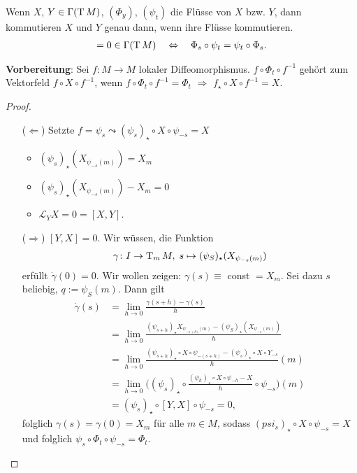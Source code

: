 \begin{proposition}
	Wenn $X$, $Y\in\Gamma(\operatorname{T} M)$, $(\Phi_y)$, $(\psi_t)$ die Flüsse von $X$ bzw. $Y$, dann kommutieren $X$ und $Y$ genau dann, wenn ihre Flüsse kommutieren.\begin{align*}
		[X,Y] = 0\in\Gamma(\T M)\quad\Leftrightarrow \quad\Phi_s\circ\psi_t = \psi_t\circ\Phi_s.
	\end{align*}
\end{proposition}

\textbf{Vorbereitung}: Sei $f\colon M\to M$ lokaler Diffeomorphismus. $f\circ \Phi_t\circ f^{-1}$ gehört zum Vektorfeld $f\circ X\circ f^{-1}$, wenn $f\circ\Phi_t\circ f^{-1}=\Phi_t$ $\Rightarrow$ $f_\star\circ X\circ f^{-1} = X$.

\begin{proof}
	\leavevmode\begin{itemize}[wide=0pt,leftmargin=*,widest={($\Rightarrow$)},topsep=-6pt]
		\item[($\Leftarrow$)] Setzte $f=\psi_s\leadsto (\psi_s)_\star\circ X\circ \psi_{-s} = X$\begin{itemize}[topsep=-0.25\baselineskip,label={$\Rightarrow$}]
			\item $(\psi_s)_\star(X_{\psi_{-s}(m)}) = X_m$
			\item $(\psi_s)_\star(X_{\psi_{-s}(m)}) - X_m = 0$
			\item $\mathcal L_Y X = 0 = [X,Y]$.
		\end{itemize}
		\item[($\Rightarrow$)] $[Y,X] = 0$. Wir wüssen, die Funktion \begin{align*}
			\gamma\colon I\to \operatorname{T}_m M,\; s\mapsto (\psi_S)_\star(X_{\psi_{-s}(m)})
		\end{align*}
		erfüllt $\dot\gamma(0) = 0$. Wir wollen zeigen: $\gamma(s)\equiv$ const $=X_m$. Sei dazu $s$ beliebig, $q := \psi_S(m)$. Dann gilt \begin{align*}
			\dot\gamma(s) &= \lim\limits_{h\to 0} \frac{\gamma(s+h)-\gamma(s)}{h} \\
			&= \lim\limits_{h\to 0} \frac{(\psi_{s+h})_\star X_{\psi_{-s+h)}(m)} - (\psi_S)_\star(X_{\psi_{-s}(m)})}h \\
			&=\lim\limits_{h\to 0} \frac{(\psi_{s+h})_\star\circ X\circ \psi_{-(s+h)}-(\psi_s)_\star \circ X\circ Y_{-s}}{h}(m)\\
			&= \lim\limits_{h\to 0} \big( (\psi_s)_\star\circ \frac{(\psi_h)_\star\circ X\circ \psi_{-h}-X}{h}\circ \psi_{-s}\big)(m)\\
			&= (\psi_s)_\star\circ[Y,X]\circ \psi_{-s} = 0,
		\end{align*}
		folglich $\gamma(s) = \gamma(0) = X_m$ für alle $m\in M$, sodass $(psi_s)_\star\circ X\circ \psi_{-s} = X$ und folglich $\psi_s\circ\Phi_t\circ\psi_{-s} = \Phi_t$.
	\end{itemize}
\end{proof}

